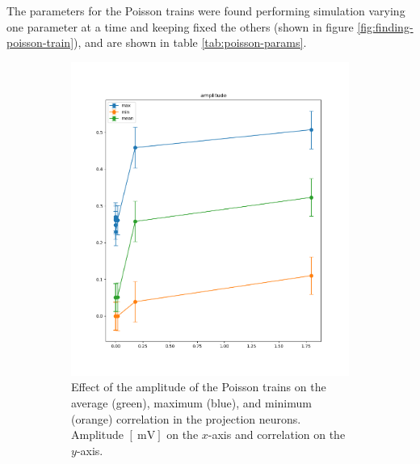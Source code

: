     The parameters for the Poisson trains were found performing simulation varying one parameter at a time and keeping fixed the others (shown in figure \ref{fig:finding-poisson-train}), and are shown in table \ref{tab:poisson-params}.

    \begin{figure}
      \begin{subfigure}[t]{0.48\textwidth}
        \centering
        \includegraphics[width=\textwidth]{poisson-train-amplitude}
        \caption{Effect of the amplitude of the Poisson trains on the average (green), maximum (blue), and minimum (orange) correlation in the projection neurons. Amplitude $[\SI{}{\milli\volt}]$ on the $x$-axis and correlation on the $y$-axis.}
        \label{fig:finding-poisson-train-amplitude}
      \end{subfigure}
      \begin{subfigure}[t]{0.48\textwidth}
        \centering

\end{subfigure}
\end{figure}
